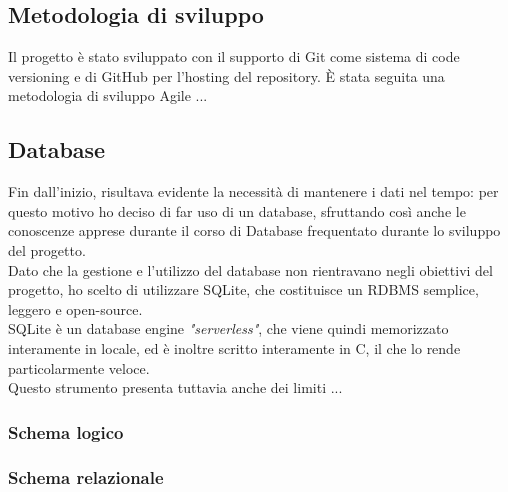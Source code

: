 \documentclass[12pt,a4paper]{article}
\begin{document}
	\subsection{Metodologia di sviluppo}
	Il progetto è stato sviluppato con il supporto di Git come sistema di code versioning e di GitHub per l'hosting del repository.
	È stata seguita una metodologia di sviluppo Agile ...
	\subsection{Database}
	Fin dall'inizio, risultava evidente la necessità di mantenere i dati nel tempo: per questo motivo ho deciso di far uso di un database, sfruttando così anche le conoscenze apprese durante il corso di Database frequentato durante lo sviluppo del progetto.\\
	Dato che la gestione e l'utilizzo del database non rientravano negli obiettivi del progetto, ho scelto di utilizzare SQLite, che costituisce un RDBMS semplice, leggero e open-source.\\
	SQLite è un database engine \textit{"serverless"}, che viene quindi memorizzato interamente in locale, ed è inoltre scritto interamente in C, il che lo rende particolarmente veloce.\\
	Questo strumento presenta tuttavia anche dei limiti ... \\
	\subsubsection{Schema logico}
	
	\subsubsection{Schema relazionale}
\end{document}

